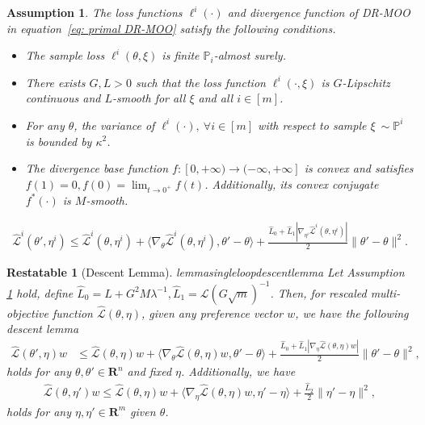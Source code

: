 \documentclass[10pt,a4paper]{amsart}
\newtheorem{assumption}{Assumption}
\newtheorem{restatable}{Restatable}
\def\eqref#1{equation~\ref{#1}}
\newcommand{\fL}{\mathcal{L}}
\newcommand{\fhL}{\hat{\mathcal{L}}}
\newcommand{\hL}{\hat{L}}
\begin{document}
\begin{assumption}\label{assumption 1}
The loss functions $\ell^i(\cdot)$ and divergence function of DR-MOO in \eqref{eq: primal DR-MOO} satisfy the following conditions.
\begin{itemize}[leftmargin = *, topsep = 0pt]
    \item The sample loss $\ell^i(\theta,\xi)$ is finite $\mathbb{P}_i$-almost surely.
    \item There exists $G,L>0$ such that the loss function $\ell^{i}(\cdot, \xi)$ is $G$-Lipschitz continuous and $L$-smooth for all $\xi$ and all $i\in[m]$.
        \item For any ${\theta}$, the variance of $\ell^i(\cdot),~\forall i\in[m]$ with respect to sample $\xi~\sim \mathbb{P}^i$ is bounded by $\kappa^2$. %
    \item The divergence base function $f:[0,+\infty)\rightarrow (-\infty,+\infty]$ is convex and satisfies $f(1)=0, f(0)=\lim_{t\rightarrow 0^{+}}f(t)$. Additionally, its convex conjugate $f^*(\cdot)$ is $M$-smooth.
\end{itemize}    
\end{assumption}

\begin{align}
    {\fhL}^i({\theta}', \eta^i) \leq {\fhL}^i({\theta}, \eta^i)+\langle\nabla_{{\theta}} {\fhL}^i({\theta}, \eta^i), {\theta}'-{\theta}\rangle+\frac{\hL_0+\hL_1|\nabla_{\eta^i} {\fhL^i}({\theta}, \eta^i)|}{2}\|{\theta}'-{\theta}\|^2.
    \label{eq: single-objective descent lemma}
\end{align}

\begin{restatable}[Descent Lemma]{lemma}{singleloopdescentlemma}
    Let Assumption \ref{assumption 1} hold, define $\hL_0 = L+G^2M\lambda^{-1}, \hL_1 = \fL(G\sqrt{m})^{-1}$. Then, for rescaled multi-objective function $\fhL({\theta}, {\eta})$, given any preference vector $w$,
    we have the following descent lemma
    \begin{align}
        \fhL({\theta}', {\eta}){w} &\leq \fhL({\theta}, {\eta}){w} + \langle\nabla_{{\theta}}\fhL({\theta}, {\eta}){w}, {\theta}'-{\theta} \rangle +\frac{\hL_0+\hL_1 |\nabla_{\eta}\fhL(\theta,\eta)w|}{2}\|{\theta}'-{\theta} \|^2,
        \label{eq: moo descent lemma theta}
\end{align}
holds for any $\theta,\theta'\in \mathbf{R}^n$ and fixed $\eta$. Additionally, we have
\begin{align}
        \fhL({\theta}, {\eta}'){w}\leq \fhL({\theta}, {\eta}){w} +\langle\nabla_{\eta}\fhL(\theta,\eta)w,\eta'-\eta \rangle + \frac{\hL_2}{2}\|\eta'-\eta\|^2,
        \label{eq: moo descent lemma eta}
\end{align}
holds for any $\eta,\eta'\in\mathbf{R}^m$ given $\theta$.

\end{restatable}
\end{document}
